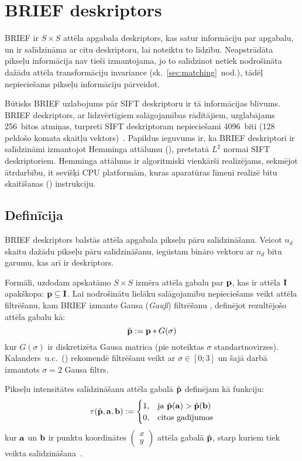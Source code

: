 \section{BRIEF deskriptors} \label{sec:brief}
BRIEF ir $S \times S$ attēla apgabala deskriptors, kas satur informāciju par
apgabalu, un ir salīdzināma ar citu deskriptoru, lai noteiktu to līdzību.
Neapstrādāta pikseļu informācija nav tieši izmantojama, jo to salīdzinot
netiek nodrošināta dažādu attēla transformāciju invariance
(sk.~\ref{sec:matching}~nod.), tādēļ nepieciešams pikseļu informāciju
pārveidot.

Būtisks BRIEF uzlabojums pār SIFT deskriptoru ir tā informācijas blīvums.
BRIEF deskriptors, ar līdzvērtīgiem salāgojamības rādītājiem, uzglabājams
256~bitos atmiņas, turpretī SIFT deskriptoram nepieciešami 4096~biti
(128 peldošo komata skaitļu vektors)~\cite{BRIEF}. Papildus ieguvums ir,
ka BRIEF deskriptori ir salīdzināmi izmantojot Hemminga attālumu
(), pretstatā $L^2$ normai SIFT deskriptoriem.
Hemminga attālums ir algoritmiski vienkārši realizējams, sekmējot ātrdarbību,
it sevišķi CPU platformām, kuras aparatūras līmenī realizē
bitu skaitīšanas () instrukciju.

\subsection{Definīcija} \label{sec:brief-def}
BRIEF deskriptors balstās attēla apgabala pikseļu pāru salīdzināšanu.
Veicot $n_d$ skaitu dažādu pikseļu pāru salīdzināšanu, iegūstam
bināro vektoru ar $n_d$ bitu garumu, kas arī ir deskriptors.
\cite{BRIEF}\cite{ORB}

Formāli, uzdodam apskatāmo $S \times S$ izmēra attēla gabalu par
$\mathbf{p}$, kas ir attēla $\mathbf{I}$ apakškopa:
$\mathbf{p} \subseteq \mathbf{I}$. Lai nodrošinātu lielāku salāgojamību nepieciešams
veikt attēla filtrēšanu, kam BRIEF izmanto Gausa (\textit{Gauß}) filtrēšanu
\cite{BRIEF}, definējot rezultējošo attēla gabalu kā:
\[
	\hat{\mathbf{p}} := \mathbf{p} \ast G(\sigma)
\]
kur $G(\sigma)$ ir diskretizēta Gausa matrica
(pie noteiktas $\sigma$ standartnovirzes).\\
Kalanders~u.c.\cite{BRIEF}~()
rekomendē filtrēšanu veikt ar $\sigma \in [0; 3]$ un šajā darbā izmantots
$\sigma = 2$ Gausa filtrs.

Pikseļu intensitātes salīdzināšanu attēla gabalā $\hat{\mathbf{p}}$ definējam kā funkciju:
\begin{equation}
	\tau (\hat{\mathbf{p}}, \mathbf{a}, \mathbf{b}) := 
		\begin{cases}
			1\text{,} & \text{ja } \hat{\mathbf{p}}(\mathbf{a}) > \hat{\mathbf{p}}(\mathbf{b}) \\
			0\text{,} & \text{citos gadījumos}
		\end{cases}
\end{equation}
kur $\mathbf{a}$ un $\mathbf{b}$ ir punktu koordinātes
$\left(\begin{smallmatrix}x\\y\end{smallmatrix}\right)$
attēla gabalā $\hat{\mathbf{p}}$, starp kuriem tiek
veikta salīdzināšana~\cite{BRIEF}. 

